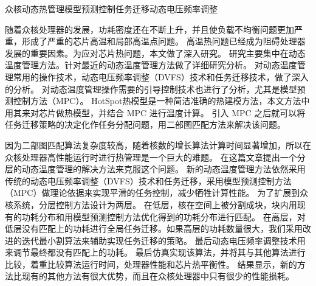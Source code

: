 
\begin{Cabstract}{众核}{动态热管理}{模型预测控制}{任务迁移}{动态电压频率调整}

随着众核处理器的发展，功耗密度还在不断上升，并且使负载不均衡问题更加严重，形成了严重的芯片高温和局部高温点问题。
高温热问题已经成为阻碍处理器发展的重要因素。为应对芯片热问题，本文做了深入研究。
研究主要集中在动态温度管理方法。针对最近的动态温度管理方法做了详细研究分析。
对动态温度管理常用的操作技术，动态电压频率调整（DVFS）技术和任务迁移技术，做了深入的分析。
对动态温度管理操作需要的引导控制技术也进行了分析，尤其是模型预测控制方法（MPC）。
HotSpot热模型是一种简洁准确的热建模方法，本文方法中用其来对芯片做热模型，并结合 MPC 进行温度计算。
引入 MPC 之后就可以将任务迁移策略的决定化作任务分配问题，用二部图匹配方法来解决该问题。

因为二部图匹配算法复杂度较高，随着核数的增长算法计算时间显著增加，所以在众核处理器高性能运行时进行热管理是一个巨大的难题。
在这篇文章提出一个分层的动态温度管理的解决方法来克服这个问题。
新的动态温度管理方法依然采用传统的动态电压频率调整（DVFS）技术和任务迁移，采用模型预测控制方法（MPC）做理论依据来实现平滑的任务控制，减少牺牲计算性能。
为了扩展到众核系统，分层控制方法设计为两层。
在低层，核在空间上被分割成块，块内用现有的功耗分布和用模型预测控制方法优化得到的功耗分布进行匹配。
在高层，对低层没有匹配上的功耗进行全局任务迁移。如果高层的功耗数量很大，我们采用改进的迭代最小割算法来辅助实现任务迁移的策略。
最后动态电压频率调整技术用来调节最终都没有匹配上的功耗。
最后仿真实现该算法，并将其与其他算法进行比较，着重比较算法运行时间，处理器性能和芯片热平衡性。
结果显示，新的方法比现有的其他方法有很大优势，而且在众核处理器中只有很少的性能损耗。
\end{Cabstract}
